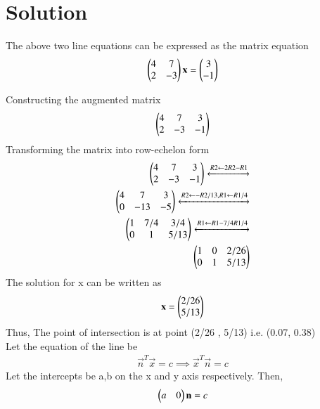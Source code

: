 \documentclass[journal,12pt,twocolumn]{IEEEtran}
\begin{document}
    \section{Solution}
    The above two line equations can be expressed as the matrix equation
    \begin{align}
    \begin{pmatrix}4 & 7\\2 & -3 \end{pmatrix}{\mathbf{x}} = \begin{pmatrix}3\\-1 \end{pmatrix}
    \end{align}
    \begin{flushleft}
    Constructing the augmented matrix \\
    \begin{align}
    \begin{pmatrix}4 & 7 & 3 \\ 
        2 & -3 & -1 \end{pmatrix}
    \end{align}
    Transforming the matrix into row-echelon form \\
    \begin{align}
    \begin{pmatrix}
    4 & 7 & 3 \\
    2 & -3 & -1
    \end{pmatrix}
      \xleftrightarrow[]{R2 \leftarrow 2R2 - R1 } \nonumber \\
    \begin{pmatrix}
    4 & 7 & 3 \\
    0 & -13 & -5
    \end{pmatrix}
    \xleftrightarrow[]{R2 \leftarrow -R2/13,R1 \leftarrow R1/4} \nonumber \\
    \begin{pmatrix}
    1 & 7/4 & 3/4 \\
    0 & 1 & 5/13
    \end{pmatrix}
    \xleftrightarrow[]{R1 \leftarrow R1-7/4R1/4} \nonumber \\
    \begin{pmatrix}
    1 & 0 & 2/26 \\
    0 & 1 & 5/13
    \end{pmatrix}
    \end{align}
    The solution for x can be written as 
    \begin{align}
    \label{expk}
    \mathbf{x} = \begin{pmatrix}2/26 \\ 5/13\end{pmatrix}
    \end{align}
    Thus, The point of intersection is at point (2/26 , 5/13) i.e. (0.07, 0.38)\\
    Let the equation of the line be
    \begin{align}
    \label{equ}
    \vec{n}^T\vec{x} = c \implies \vec{x}^T\vec{n} = c
    \end{align}
    Let the intercepts be a,b on the x and y axis respectively. Then,
    \begin{align} 
    \begin{pmatrix}a & 0\end{pmatrix}\mathbf{n} = c
    \end{align}
    \\

\end{flushleft}
\end{document}
